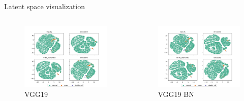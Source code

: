 \documentclass[aspectratio=169]{beamer}
\begin{document}
\begin{frame}{Latent space visualization}
    \begin{columns}
        \begin{column}{0.45\textwidth}
            \begin{figure}
                \centering
                \includegraphics[width=\columnwidth,trim={0 0 0 1cm},clip]{./results/vgg19_vgg19/20230510_172958_feature_vectors_1.png}
                \caption*{VGG19}
            \end{figure}
        \end{column}
        \begin{column}{0.45\textwidth}
            \begin{figure}
                \centering
                \includegraphics[width=\columnwidth,trim={0 0 0 1cm},clip]{./results/vgg19_bn_vgg19/20230525_045131_feature_vectors_1.png}
                \caption*{VGG19 BN}
            \end{figure}
        \end{column}
    \end{columns}
\end{frame}
\end{document}
